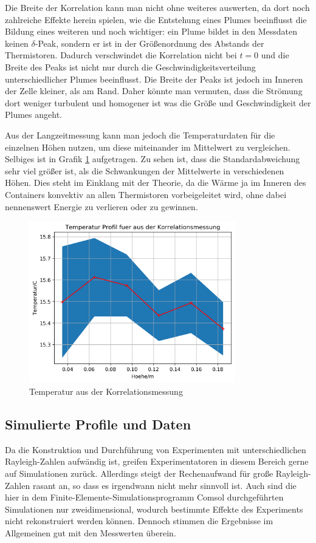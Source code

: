 \documentclass[12pt,a4paper,titlepage,headinclude]{scrartcl}
\numberwithin{equation}{subsection}
\begin{document}
Die Breite der Korrelation kann man nicht ohne weiteres auswerten, da dort noch zahlreiche Effekte herein spielen, wie die Entstehung eines Plumes beeinflusst die Bildung eines weiteren und noch wichtiger: ein Plume bildet in den Messdaten keinen $\delta$-Peak, sondern er ist in der Größenordnung des Abstands der Thermistoren.
Dadurch verschwindet die Korrelation nicht bei $t=0$ und die Breite des Peaks ist nicht nur durch die Geschwindigkeitsverteilung unterschiedlicher Plumes beeinflusst.
Die Breite der Peaks ist jedoch im Inneren der Zelle kleiner, als am Rand.
Daher könnte man vermuten, dass die Strömung dort weniger turbulent und homogener ist was die Größe und Geschwindigkeit der Plumes angeht.



Aus der Langzeitmessung kann man jedoch die Temperaturdaten für die einzelnen Höhen nutzen, um diese miteinander im Mittelwert zu vergleichen.
Selbiges ist in Grafik \ref{fig:T_kor} aufgetragen.
Zu sehen ist, dass die Standardabweichung sehr viel größer ist, als die Schwankungen der Mittelwerte in verschiedenen Höhen.
Dies steht im Einklang mit der Theorie, da die Wärme ja im Inneren des Containers konvektiv an allen Thermistoren vorbeigeleitet wird, ohne dabei nennenswert Energie zu verlieren oder zu gewinnen.
\begin{figure}[!ht]
\centering
\includegraphics[width=0.8\textwidth]{T_kor}
\caption{Temperatur aus der Korrelationsmessung}
\label{fig:T_kor}
\end{figure}



\subsection{Simulierte Profile und Daten}
\label{sec:simulation}
Da die Konstruktion und Durchführung von Experimenten mit unterschiedlichen Rayleigh-Zahlen aufwändig ist, greifen Experimentatoren in diesem Bereich gerne auf Simulationen zurück.
Allerdings steigt der Rechenaufwand für große Rayleigh-Zahlen rasant an, so dass es irgendwann nicht mehr sinnvoll ist.
Auch sind die hier in dem Finite-Elemente-Simulationsprogramm Comsol durchgeführten Simulationen nur zweidimensional, wodurch bestimmte Effekte des Experiments nicht rekonstruiert werden können.
Dennoch stimmen die Ergebnisse im Allgemeinen gut mit den Messwerten überein.\\
\end{document}
